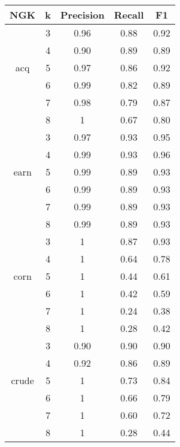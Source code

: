 \begin{tabular}{| c | c | c | c | c | }
	\hline NGK & k & Precision & Recall & F1   \\ \hline
			
	& 3 & 0.96 & 0.88 & 0.92     \\ 
	 & 4 & 0.90 & 0.89 &  0.89    \\
acq	& 5 & 0.97 & 0.86 & 0.92     \\ 
	& 6 & 0.99 & 0.82 & 0.89     \\
	& 7 & 0.98 & 0.79 & 0.87     \\
	& 8 & 1 & 0.67 & 0.80     \\
	\hline
	
	
	
	& 3 & 0.97 & 0.93 &  0.95    \\ 
	 & 4 & 0.99 & 0.93 &  0.96    \\ 
	earn & 5 & 0.99 & 0.89 &  0.93    \\ 
	& 6 & 0.99 & 0.89 &  0.93    \\ 
	& 7 & 0.99 & 0.89 &  0.93    \\ 
	& 8 & 0.99 & 0.89 &  0.93    \\ \hline
	
	
	
	& 3 & 1 & 0.87 & 0.93     \\ 
	 & 4 & 1 & 0.64 & 0.78     \\ 
	corn	& 5 & 1 & 0.44 &  0.61    \\ 
	& 6 & 1 & 0.42 & 0.59     \\ 
	& 7 & 1 & 0.24 & 0.38    \\ 
	& 8 & 1 & 0.28& 0.42     \\ \hline
	
	
	& 3 & 0.90 & 0.90 &  0.90    \\ 
	 & 4 & 0.92 & 0.86 & 0.89     \\ 
	crude & 5 & 1 & 0.73 &  0.84    \\ 
	& 6 & 1 & 0.66 &  0.79    \\
	& 7 & 1 & 0.60 &  0.72    \\
	& 8 & 1 & 0.28 &  0.44    \\ \hline
	
	
	
\end{tabular}